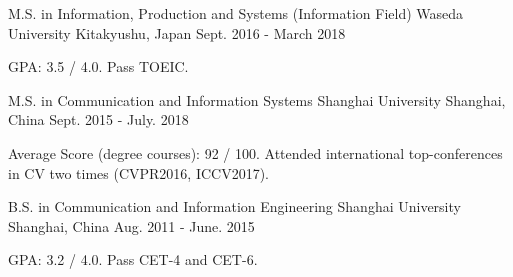 

\begin{cventries}

  \cventry
    {M.S. in Information, Production and Systems (Information Field)} %
    {Waseda University} %
    {Kitakyushu, Japan} %
    {Sept. 2016 - March 2018} %
    {
      \begin{cvitems} %
        \item {GPA: 3.5 / 4.0. Pass TOEIC.}
      \end{cvitems}
    }
    
  \cventry
    {M.S. in Communication and Information Systems} %
    {Shanghai University} %
    {Shanghai, China} %
    {Sept. 2015 - July. 2018} %
    {
      \begin{cvitems} %
        \item {Average Score (degree courses): 92 / 100. Attended international top-conferences in CV two times (CVPR2016, ICCV2017).}
      \end{cvitems}
    }
    
  \cventry
    {B.S. in Communication and Information Engineering} %
    {Shanghai University} %
    {Shanghai, China} %
    {Aug. 2011 - June. 2015} %
    {
      \begin{cvitems} %
        \item {GPA: 3.2 / 4.0. Pass CET-4 and CET-6.}
      \end{cvitems}
    }

\end{cventries}

